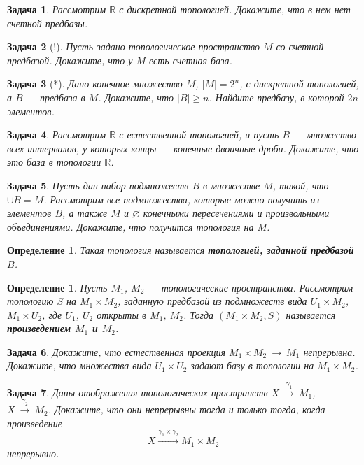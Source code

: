 \documentclass[12pt]{book}
\newcommand{\arrow}{{\:\longrightarrow\:}}
\renewcommand{\emptyset}{\varnothing}
\def\R{{\mathbb R}}
\theoremstyle{upshape}
\newtheorem{zadacha}{Задача}[chapter]
\theoremstyle{generic}
\newtheorem{opredelenie}[teorema]{Определение}
\theoremstyle{upshapenonumber}
\newcommand{\следствие}{%
     \refstepcounter{teorema}
     {\noindent\bf Следствие \thechapter.\arabic{teorema}:\ }}
\newcommand{\пример}{%
     \refstepcounter{teorema}
     {\noindent\bf Пример \thechapter.\arabic{teorema}:\ }}
\newcommand{\лемма}{%
     \refstepcounter{teorema}
     {\noindent\bf Лемма \thechapter.\arabic{teorema}:\ }}
\newcommand{\теорема}{%
     \refstepcounter{teorema}
     {\noindent\bf Теорема \thechapter.\arabic{teorema}:\ }}
\newcommand{\утверждение}{%
     \refstepcounter{teorema}
     {\noindent\bf Утверждение \thechapter.\arabic{teorema}:\ }}
\begin{document}
{\begin{zadacha} Рассмотрим $\R$ с дискретной топологией. Докажите, что
в нем нет счетной предбазы.
\end{zadacha}

\begin{zadacha}[!]\label{count}
Пусть задано топологическое пространство $M$ со счетной
предбазой. Докажите, что у $M$ есть счетная база.
\end{zadacha}

\begin{zadacha}[*]
Дано конечное множество $M$, $|M|=2^n$, с дискретной топологией, а
$B$ --- предбаза в $M$. Докажите, что $|B| \geq n$. Найдите предбазу,
в которой $2n$ элементов.
\end{zadacha}

\begin{zadacha} 
Рассмотрим $\R$ с естественной топологией, и пусть $B$ --- множество
всех интервалов, у которых концы --- конечные двоичные дроби.
Докажите, что это база в топологии $\R$.
\end{zadacha}

\begin{zadacha}
Пусть дан набор подмножеств $B$ в множестве $M$, такой, что
$\cup B=M$.  Рассмотрим все
подмножества, которые можно получить из элементов $B$, 
а также $M$ и $\emptyset$ конечными пересечениями
и произвольными объединениями. Докажите, что получится топология на
$M$.
\end{zadacha}

\begin{opredelenie}
Такая топология называется {\bf топологией, заданной предбазой $B$}.
\end{opredelenie}

\begin{opredelenie}
Пусть $M_1$, $M_2$ --- топологические пространства.  Рассмотрим
топологию $S$ на $M_1 \times M_2$, заданную предбазой из подмножеств
вида $U_1\times M_2$,
$M_1\times U_2$, где $U_1$, $U_2$ открыты в $M_1$, $M_2$. Тогда
$(M_1\times M_2, S)$ называется {\bf произведением $M_1$ и $M_2$}.
\end{opredelenie}

\begin{zadacha}
Докажите, что естественная проекция $M_1 \times M_2\arrow M_1$
непрерывна. Докажите, что множества вида $U_1\times U_2$
задают базу в топологии на $M_1 \times M_2$.
\end{zadacha}

\begin{zadacha}\label{_product_nepre_Zadacha_}
Даны отображения топологических пространств
$X\overset{\gamma_1}{\arrow} M_1$, $X\overset{\gamma_2}{\arrow}
M_2$. Докажите, что они непрерывны тогда и только тогда, когда
произведение
\[
X\overset{\gamma_1\times \gamma_2}{\arrow} M_1\times M_2
\]
непрерывно.
\end{zadacha}

}
\end{document}
